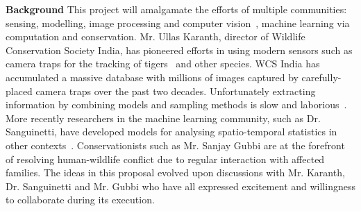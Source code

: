 \documentclass[a4paper,10pt,twocolumn]{article}
\newcommand{\hdg}[1] {\noindent \textbf{#1} }
\begin{document}

\hdg{Background}
This project will amalgamate the efforts of multiple communities: sensing, modelling, image processing and computer vision~\cite{yu2013automated}, machine learning via computation and conservation. Mr. Ullas Karanth, director of Wildlife Conservation Society India, has pioneered efforts in using modern sensors such as camera traps for the tracking of tigers~\cite{hiby2009tiger} and other species. WCS India has accumulated a massive database with millions of images captured by carefully-placed camera traps over the past two decades. 
Unfortunately extracting information by combining models and sampling methods is slow and laborious~\cite{karanth1992population}. More recently researchers in the machine learning community, such as Dr. Sanguinetti, have developed models for analysing spatio-temporal statistics in other contexts~\cite{RIS_0}. Conservationists such as Mr. Sanjay Gubbi are at the forefront of resolving human-wildlife conflict due to regular interaction with affected families. The ideas in this proposal evolved upon discussions with Mr. Karanth, Dr. Sanguinetti and Mr. Gubbi who have all expressed excitement and willingness to collaborate during its execution.  
\end{document}
